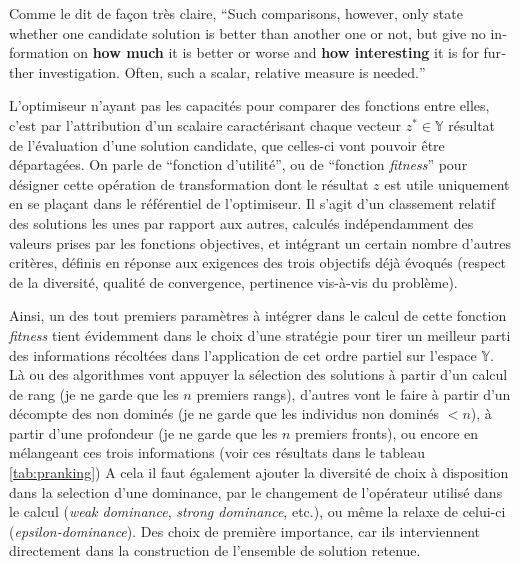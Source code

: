 Comme le dit de façon très claire,\textcite[94]{Weise2011} \foreignquote{english}{Such comparisons, however, only state whether one candidate solution is better than another one or not, but give no information on \textbf{how much} it is better or worse and \textbf{how interesting} it is for further investigation. Often, such a scalar, relative measure is needed.}

L'optimiseur n'ayant pas les capacités pour comparer des fonctions entre elles, c'est par l'attribution d'un scalaire caractérisant chaque vecteur $z^* \in \mathbb{Y}$ résultat de l'évaluation d'une solution candidate, que celles-ci vont pouvoir être départagées. On parle de \enquote{fonction d'utilité}, ou de \enquote{fonction \textit{fitness}} pour désigner cette opération de transformation dont le résultat $z$ est utile uniquement en se plaçant dans le référentiel de l'optimiseur. Il s'agit d'un classement relatif des solutions les unes par rapport aux autres, calculés indépendamment des valeurs prises par les fonctions objectives, et intégrant un certain nombre d'autres critères, définis en réponse aux exigences des trois objectifs déjà évoqués (respect de la diversité, qualité de convergence, pertinence vis-à-vis du problème).

Ainsi, un des tout premiers paramètres à intégrer dans le calcul de cette fonction \textit{fitness} tient évidemment dans le choix d'une stratégie pour tirer un meilleur parti des informations récoltées dans l'application de cet ordre partiel sur l'espace $\mathbb{Y}$. Là ou des algorithmes vont appuyer la sélection des solutions à partir d'un calcul de rang (je ne garde que les $n$ premiers rangs), d'autres vont le faire à partir d'un décompte des non dominés (je ne garde que les individus non dominés $< n$), à partir d'une profondeur (je ne garde que les $n$ premiers fronts), ou encore en mélangeant ces trois informations (voir ces résultats dans le tableau \ref{tab:pranking}) A cela il faut également ajouter la diversité de choix à disposition dans la selection d'une dominance, par le changement de l'opérateur utilisé dans le calcul (\textit{weak dominance}, \textit{strong dominance}, etc.), ou même la relaxe de celui-ci (\textit{epsilon-dominance}). Des choix de première importance, car ils interviennent directement dans la construction de l'ensemble de solution retenue.

\pagebreak

